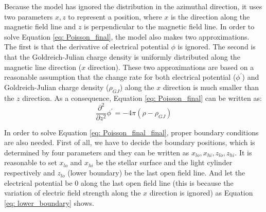 \documentclass[12pt]{report}
\newcommand{\gj}[0]{
  Goldreich-Julian charge density
}
\begin{document}
    Because the model has ignored the distribution in the azimuthal direction, it uses two 
    parameters $x, z$ to represent a position, where $x$ is the direction along the magnetic 
    field line and $z$ is perpendicular to the magnetic field line. In order to solve 
    Equation \ref{eq: Poisson_final}, the model also makes two approximations. The first is that 
    the derivative of electrical potential $\phi$ is ignored. The second is that the \gj{} 
    is uniformly distributed along the magnetic line direction ($x$ direction). These two 
    approximations are based on a reasonable assumption that the change rate 
    for both electrical potential ($\phi^{\prime}$) and \gj{}($\rho_{GJ}$) along the $x$ 
    direction is much smaller than the $z$ direction. 
    As a consequence, Equation \ref{eq: Poisson_final} can be written as: 
    \begin{equation}
      \label{eq: Poisson_final_final}
      \frac{\partial^2}{\partial z^2} \phi^{\prime} = -4\pi\left(\rho - \rho_{GJ} \right)
    \end{equation}

    In order to solve Equation \ref{eq: Poisson_final_final}, proper boundary conditions are also 
    needed. First of all, we have to decide the boundary positions, which is determined by 
    four parameters and they can be written as $x_{lo}, x_{hi}, z_{lo}, z_{hi}$. It is 
    reasonable to set $x_{lo}$ and $x_{hi}$ be the stellar surface and the light cylinder 
    respectively and $z_{lo}$ (lower boundary) be the last open field line. And let the 
    electrical potential be $0$ along the last open field line (this is because the 
    variation of electric field strength along the $x$ direction is ignored) as Equation 
    \ref{eq: lower_boundary} shows.  
\end{document}
